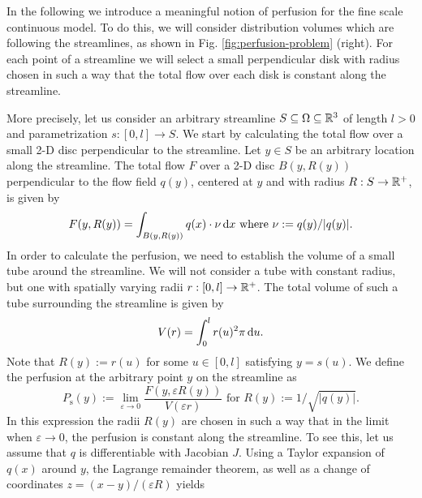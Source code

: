 \documentclass[journal,twocolumn]{IEEEtran}
\newcommand{\Perfs}{P_{\mathrm{s}}}
\begin{document}
	In the following we introduce a meaningful notion of perfusion for the fine scale continuous model.
	To do this, we will consider distribution volumes which are following the streamlines, as shown in Fig. \ref{fig:perfusion-problem} (right). 	
	For each point of a streamline we will select a small perpendicular disk with radius chosen in such a way that the total flow over each disk is constant along the streamline.
		
	More precisely, let us consider an arbitrary streamline $S \subseteq \Omega \subseteq \mathbb{R}^3$ of length $l>0$ and parametrization $s:[0,l] \to S$.
	We start by calculating the total flow over a small 2-D disc perpendicular to the streamline.
	Let $y \in S$ be an arbitrary location along the streamline. 
	The total flow $F$ over a 2-D disc $B(y,R(y))$ perpendicular to the flow field $q(y)$, centered at $y$ and with radius $R:S\to\mathbb{R}^+$, is given by
	\begin{equation}
		F(y,R(y)) = \int_{B(y,R(y))} q(x) \cdot \nu \diffint x \text{ where }\nu := q(y)/\vert q(y) \vert.
		\label{eq:Fdisc}
	\end{equation}
	In order to calculate the perfusion, we need to establish the volume of a small tube around the streamline.
	We will not consider a tube with constant radius, but one with spatially varying radii $r:[0,l] \to \mathbb{R}^+$.
	The total volume of such a tube surrounding the streamline is given by
	\begin{equation}
		V(r) = \int_0^l r(u)^2 \pi \,\mathrm{d} u.
	\end{equation}
        Note that $R(y):=r(u)$ for some $u \in [0,l]$ satisfying $y=s(u)$. We define the perfusion at the arbitrary point $y$ on the streamline as
	\begin{equation}
		\Perfs(y):=  \lim_{\varepsilon \to 0} \frac{F(y,\varepsilon R(y))}{V(\varepsilon r)} \text{ for } R(y):=1/\sqrt{\vert q(y) \vert}.
		\label{eq:perfusiondef}
	\end{equation}
	In this expression the radii $R(y)$ are chosen in such a way that in the limit when $\varepsilon \to 0$, the perfusion is constant along the streamline. 
	To see this, let us assume that $q$ is differentiable with Jacobian $J$.
	Using a Taylor expansion of $q(x)$ around $y$, the Lagrange remainder theorem, as well as a change of coordinates $z = (x-y)/(\varepsilon R)$ yields 
\end{document}
